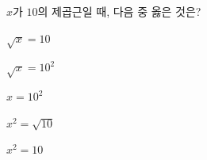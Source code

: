 $x$가 $10$의 제곱근일 때, 다음 중 옳은 것은?
\begin{choices32}{\rule[-3ex]{0pt}{8ex}$\sqrt{x}=10$}{\rule[-3ex]{0pt}{8ex}$\sqrt{x}=10^2$}{\rule[-3ex]{0pt}{8ex}$x=10^2$}{\rule[-3ex]{0pt}{8ex}$x^2=\sqrt{10}$}{\rule[-3ex]{0pt}{8ex}$x^2=10$}\end{choices32}
